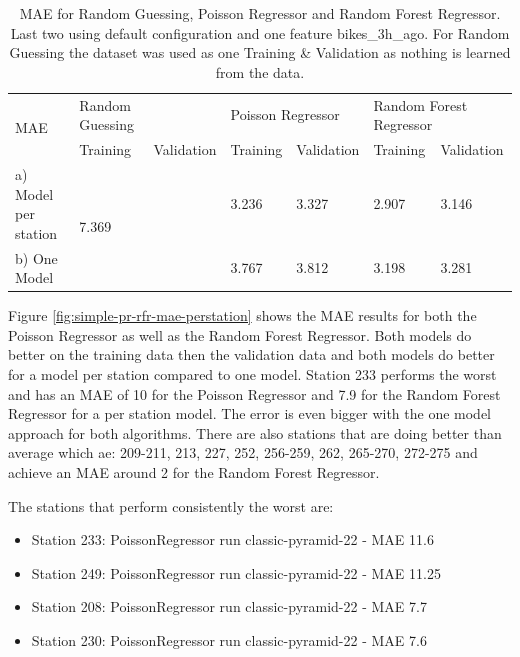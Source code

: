 \documentclass[a4paper]{article}
\begin{document}
    \begin{table}[h]
        \centering
        \begin{tabularx}{\textwidth}{|X|XX|XX|XX|}
            \hline
            \multirow{2}{*}{MAE} & \multicolumn{1}{l|}{Random Guessing} & & \multicolumn{2}{l|}{Poisson Regressor} & \multicolumn{2}{l|}{Random Forest Regressor} \\ \cline{2-7}
            & \multicolumn{1}{l|}{Training} & Validation & \multicolumn{1}{l|}{Training} & Validation & \multicolumn{1}{l|}{Training} & Validation \\ \hline
            a) Model per station & \multicolumn{2}{l|}{\multirow{2}{*}{7.369}} & \multicolumn{1}{l|}{3.236}    & 3.327      & \multicolumn{1}{l|}{2.907}    & 3.146      \\ \cline{1-1} \cline{4-7}
            b) One Model & \multicolumn{2}{l|}{} & \multicolumn{1}{l|}{3.767} & 3.812 & \multicolumn{1}{l|}{3.198}    & 3.281      \\ \hline
        \end{tabularx}
        \caption{MAE for Random Guessing, Poisson Regressor and Random Forest Regressor. Last two using default configuration and one feature bikes\_3h\_ago. For
        Random Guessing the dataset was used as one Training \& Validation as nothing is learned from the data.}
        \label{tbl:phase1-step2-simple-model-mae}
    \end{table}

    Figure \ref{fig:simple-pr-rfr-mae-perstation} shows the MAE results for both the Poisson Regressor as well as the
    Random Forest Regressor. Both models do better on the training data then the validation data and both models do
    better for a model per station compared to one model. Station 233 performs the worst and has an MAE of 10 for the
    Poisson Regressor and 7.9 for the Random Forest Regressor for a per station model. The error is even bigger with the
    one model approach for both algorithms. There are also stations that are doing better than average which ae: 209-211, 213, 227,
    252, 256-259, 262, 265-270, 272-275 and achieve an MAE around 2 for the Random Forest Regressor.

    The stations that perform consistently the worst are:
    \begin{itemize}
        \item Station 233: PoissonRegressor run classic-pyramid-22 - MAE 11.6
        \item Station 249: PoissonRegressor run classic-pyramid-22 - MAE 11.25
        \item Station 208: PoissonRegressor run classic-pyramid-22 - MAE 7.7
        \item Station 230: PoissonRegressor run classic-pyramid-22 - MAE 7.6
    \end{itemize}
\end{document}
